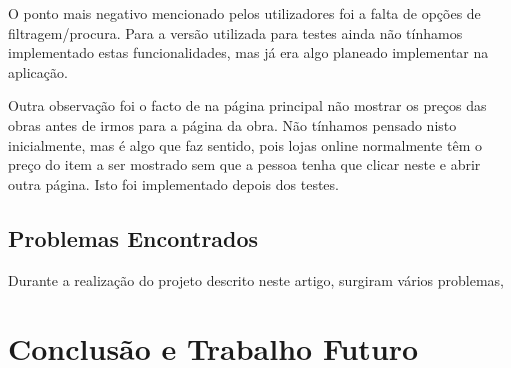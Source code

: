 \documentclass[conference]{IEEEtran}
\begin{document}
O ponto mais negativo mencionado pelos utilizadores foi a falta de opções de filtragem/procura. Para a versão utilizada para testes ainda não tínhamos implementado estas funcionalidades, mas já era algo planeado implementar na aplicação.

Outra observação foi o facto de na página principal não mostrar os preços das obras antes de irmos para a página da obra. Não tínhamos pensado nisto inicialmente, mas é algo que faz sentido, pois lojas online normalmente têm o preço do item a ser mostrado sem que a pessoa tenha que clicar neste e abrir outra página. Isto foi implementado depois dos testes.

\subsection{Problemas Encontrados}

Durante a realização do projeto descrito neste artigo, surgiram vários problemas, 

\section{Conclusão e Trabalho Futuro}



\end{document}
